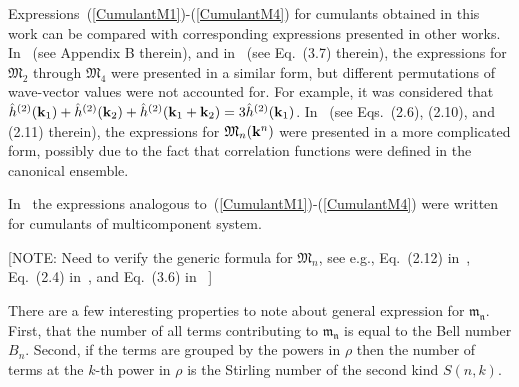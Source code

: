 Expressions~(\ref{CumulantM1})-(\ref{CumulantM4}) for cumulants obtained in this work can be compared with corresponding expressions presented in other works.
In~\cite{YukhJSP1995} (see Appendix B therein), and in~\cite{Idzik1987En} (see Eq.~(3.7) therein), the expressions for $\mathfrak{M}_2$ through $\mathfrak{M}_4$ were presented in a similar form, but different permutations of wave-vector values were not accounted for. For example, it was considered that $\hat{h}^{(2)}(\vb k_1) + \hat{h}^{(2)}(\vb k_2) + \hat{h}^{(2)}(\vb k_1 + \vb k_2) = 3\hat{h}^{(2)}(\vb k_1)$.
In~\cite{Yukh1989tmpEn} (see Eqs.~(2.6), (2.10), and (2.11) therein), the expressions for $\mathfrak{M}_n(\vb k^n)$ were presented in a more complicated form, possibly due to the fact that correlation functions were defined in the canonical ensemble.

In~\cite{Pats1990tmf} the expressions analogous to~(\ref{CumulantM1})-(\ref{CumulantM4}) were written for cumulants of multicomponent system.


[NOTE: Need to verify the generic formula for $\mathfrak M_n$, see e.g., Eq.~(2.12) in~\cite{Yukh1990}, Eq.~(2.4) in~\cite{Yukh1989tmpEn}, and Eq.~(3.6) in ~\cite{Idzik1987En}]

There are a few interesting properties to note about general expression for $\mathfrak{m_n}$. First, that the number of all terms contributing to $\mathfrak{m_n}$ is equal to the Bell number $B_n$\cite{cameron1995comb,wikiBellNum}. Second, if the terms are grouped by the powers in $\rho$ then the number of terms at the $k$-th power in $\rho$ is the Stirling number of the second kind $S(n,k)$\cite{cameron1995comb,wikiStirlingNum2}.

